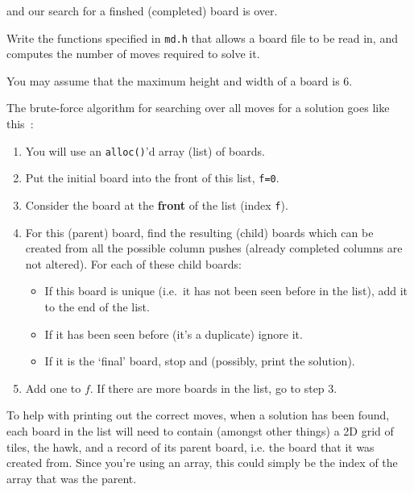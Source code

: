 \noindent
and our search for a finshed (completed) board is over.


\begin{exercise}
Write the functions specified in \verb^md.h^ that allows a board file
to be read in, and computes the number of moves required to solve it.

\noindent
You may assume that the maximum height and width of a board is $6$.

\noindent
The brute-force algorithm for searching over all moves for a
solution goes like this~:
\begin{enumerate}
\item You will use an \verb^alloc()^'d array (list) of boards.
\item Put the initial board into the front of this list, \verb^f=0^.
\item Consider the board at the {\bf front} of the list (index \verb$f$).
\item For this (parent) board, find the resulting (child) boards 
which can be created from all the possible column pushes (already
completed columns are not altered). For each of these child boards:
\begin{itemize}
\item If this board is unique (i.e.\ it has not been seen before in the list), add it to the end of the list.
\item If it has been seen before (it's a duplicate) ignore it.
\item If it is the `final' board, stop and (possibly, print the solution).
\end{itemize}
\item Add one to $f$. If there are more boards in the list, go to step $3$.
\end{enumerate}








\noindent To help with printing out the correct moves, when a solution
has been found, each board in the list will need to contain (amongst
other things) a 2D grid of tiles, the hawk, and a record of its parent board, i.e. the board
that it was created from. Since you're using an array, this could simply
be the index of the array that was the parent.


\end{exercise}
